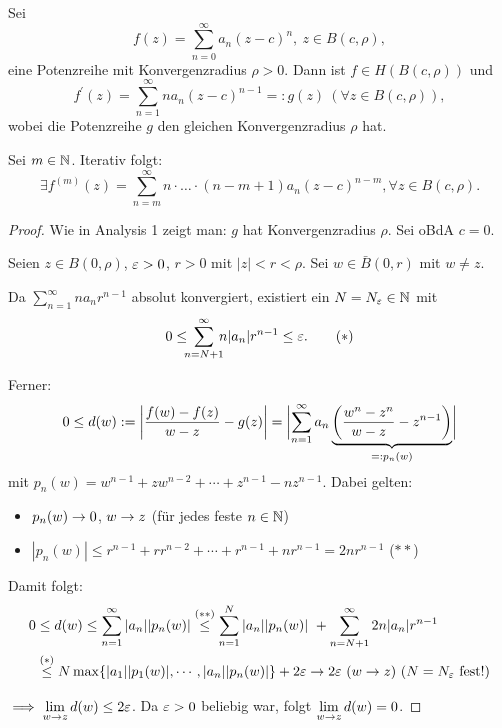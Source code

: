 \documentclass[a4paper,twoside,DIV15,BCOR12mm]{scrbook}
\begin{document}
\begin{satz} \label{satz1.3} Sei
\[f(z) = \sum_{n=0}^\infty a_n(z-c)^n,\ z\in B(c,\rho),\]
eine Potenzreihe mit Konvergenzradius $\rho > 0$. Dann ist $f\in H(B(c,\rho))$ und
\[f^\prime(z) = \sum_{n=1}^\infty n a_n(z-c)^{n-1} =: g(z)\ (\forall z\in B(c,\rho)),\]
wobei die Potenzreihe $g$ den gleichen Konvergenzradius $\rho$ hat.

Sei $m\in\mathbb{N}$. Iterativ folgt:
\[\exists f^{(m)}(z) = \sum_{n=m}^\infty n\cdot\dotsc\cdot (n-m+1) a_n(z-c)^{n-m}, \forall z\in B(c,\rho).\]
\end{satz}
\begin{proof} Wie in Analysis 1 zeigt man: $g$ hat Konvergenzradius $\rho$. Sei oBdA $c = 0$.

Seien $z\in B(0,\rho)$, $\varepsilon>0$, $r>0$ mit $|z|<r<\rho$. Sei $w\in \bar{B}(0,r)$ mit $w\neq z$.

Da $\sum_{n=1}^\infty na_nr^{n-1}$ absolut konvergiert, existiert ein $N = N_\varepsilon\in\mathbb{N}$ mit
\[0 \leq\!\!\! \sum_{n=N+1}^\infty\!\!\! n |a_n| r^{n-1} \leq \varepsilon.\tag{$\ast$}\]

Ferner:
\[0\leq d(w) := \biggl\lvert\frac{f(w)-f(z)}{w-z} - g(z)\biggr\rvert = \biggl\lvert\sum_{n=1}^\infty a_n\underbrace{\left(\frac{w^n-z^n}{w-z} - z^{n-1}\right)}_{=: p_n(w)}\biggr\rvert\]
mit $p_n(w) = w^{n-1}+zw^{n-2}+\dotsb+z^{n-1}-nz^{n-1}$.
Dabei gelten:
\begin{itemize}
\item $p_n(w) \rightarrow 0$, $w\rightarrow z$ (für jedes feste $n\in\mathbb{N}$)
\item $|p_n(w)| \leq r^{n-1} + rr^{n-2} + \dotsb + r^{n-1} + nr^{n-1} = 2nr^{n-1}$ \hfill($\ast\ast$)
\end{itemize}

Damit folgt:
\begin{align*}
0&\leq d(w) \leq \sum_{n=1}^\infty |a_n||p_n(w)| \stackrel{(\ast\ast)}{\leq} \sum_{n=1}^N |a_n||p_n(w)|\ + \sum_{n=N+1}^\infty 2n|a_n|r^{n-1}\\
&\stackrel{(\ast)}{\leq} N \max\{|a_1||p_1(w)|,\dotsb,|a_n||p_n(w)|\} + 2\varepsilon \rightarrow 2\varepsilon\ (w\rightarrow z)\ (N = N_\varepsilon\ \text{fest!})
\end{align*}

$\displaystyle\implies \lim_{w\rightarrow z} d(w) \leq 2\varepsilon$. Da $\varepsilon>0$ beliebig war, folgt $\displaystyle\lim_{w\rightarrow z} d(w) = 0$.
\end{proof}
\end{document}
